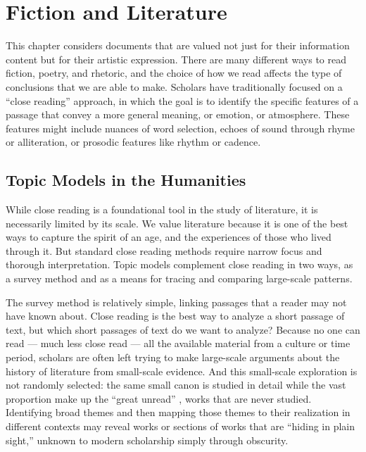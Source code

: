 
\chapter{Fiction and Literature}

\label{ch:fiction}

This chapter considers documents that are valued not just for their information content but for their artistic expression.
There are many different ways to read fiction, poetry, and rhetoric, and the choice of how we read affects the type of conclusions that we are able to make.
Scholars have traditionally focused on a ``close reading'' approach, in which the goal is to identify the specific features of a passage that convey a more general meaning, or emotion, or atmosphere.
These features might include nuances of word  selection, echoes of sound through rhyme or alliteration, or prosodic features like rhythm or cadence.

\section{Topic Models in the Humanities}

While close reading is a foundational tool in the study of literature, it is necessarily limited by its scale.
We value literature because it is one of the best ways to capture the spirit of an age, and the experiences of those who lived through it. But standard close reading methods require narrow focus and thorough interpretation.
Topic models complement close reading in two ways, as a survey method and as a means for tracing and comparing large-scale patterns.

The survey method is relatively simple, linking passages that a reader may not have known about.
Close reading is the best way to analyze a short passage of text, but which short passages of text do we want to analyze?
Because no one can read --- much less close read --- all the available material from a culture or time period, scholars are often left trying to make large-scale arguments about the history of literature from small-scale evidence. And this small-scale exploration is not randomly selected: the same small canon is studied in detail while the vast proportion make up the ``great unread'' \citep{moretti-00}, works that are never studied.
Identifying broad themes and then mapping those themes to their realization in different contexts may reveal works or sections of works that are ``hiding in plain sight,'' unknown to modern scholarship simply through obscurity.

